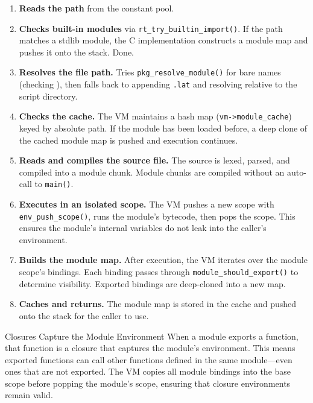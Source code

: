 \begin{enumerate}
  \item \textbf{Reads the path} from the constant pool.
  \item \textbf{Checks built-in modules} via \lstinline|rt_try_builtin_import()|.
  If the path matches a stdlib module, the C implementation constructs a module map and pushes it onto the stack.
  Done.

  \item \textbf{Resolves the file path.}
  Tries \lstinline|pkg_resolve_module()| for bare names (checking ), then falls back to appending \texttt{.lat} and resolving relative to the script directory.

  \item \textbf{Checks the cache.}
  The VM maintains a hash map (\lstinline|vm->module_cache|) keyed by absolute path.
  If the module has been loaded before, a deep clone of the cached module map is pushed and execution continues.

  \item \textbf{Reads and compiles the source file.}
  The source is lexed, parsed, and compiled into a module chunk.
  Module chunks are compiled without an auto-call to \lstinline|main()|.

  \item \textbf{Executes in an isolated scope.}
  The VM pushes a new scope with \lstinline|env_push_scope()|, runs the module's bytecode, then pops the scope.
  This ensures the module's internal variables do not leak into the caller's environment.

  \item \textbf{Builds the module map.}
  After execution, the VM iterates over the module scope's bindings.
  Each binding passes through \lstinline|module_should_export()| to determine visibility.
  Exported bindings are deep-cloned into a new map.

  \item \textbf{Caches and returns.}
  The module map is stored in the cache and pushed onto the stack for the caller to use.
\end{enumerate}

\begin{notebox}{Closures Capture the Module Environment}
When a module exports a function, that function is a closure that captures the module's environment.
This means exported functions can call other functions defined in the same module---even ones that are not exported.
The VM copies all module bindings into the base scope before popping the module's scope, ensuring that closure environments remain valid.
\end{notebox}

